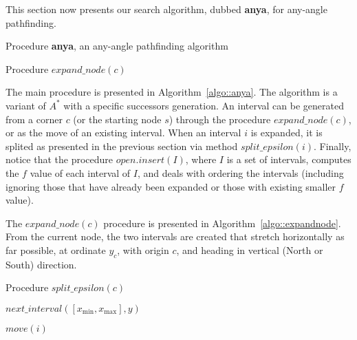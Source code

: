 This section now presents our search algorithm, 
dubbed {\bf anya}, 
for any-angle pathfinding.  

\begin{algorithm}[ht!]
  
  \caption{Procedure {\bf anya}, an any-angle pathfinding algorithm}
  \label{algo::anya}
\end{algorithm}

\begin{algorithm}[ht!]
  
  \caption{Procedure $expand\_node(c)$}
  \label{algo::expandnode}
\end{algorithm}

The main procedure is presented in Algorithm~\ref{algo::anya}.  
The algorithm is a variant of $A^*$ 
with a specific successors generation.  
An interval can be generated from a corner $c$ 
(or the starting node $s$) 
through the procedure $expand\_node(c)$, 
or as the move of an existing interval.  
When an interval $i$ is expanded, 
it is splited as presented in the previous section 
via method $split\_epsilon(i)$.  
Finally, notice that the procedure $open.insert(I)$, 
where $I$ is a set of intervals, 
computes the $f$ value of each interval of $I$, 
and deals with ordering the intervals 
(including ignoring those that have already been expanded 
or those with existing smaller $f$ value).  

The $expand\_node(c)$ procedure is presented 
in Algorithm~\ref{algo::expandnode}.  
From the current node, 
the two intervals are created 
that stretch horizontally as far possible, 
at ordinate $y_c$, with origin $c$, and heading 
in vertical (North or South) direction.  

\begin{algorithm}[ht!]
  
  \caption{Procedure $split\_epsilon(c)$}
  \label{algo::splitepsilon}
\end{algorithm}

$next\_interval([x_{\min},x_{\max}],y)$

$move(i)$

